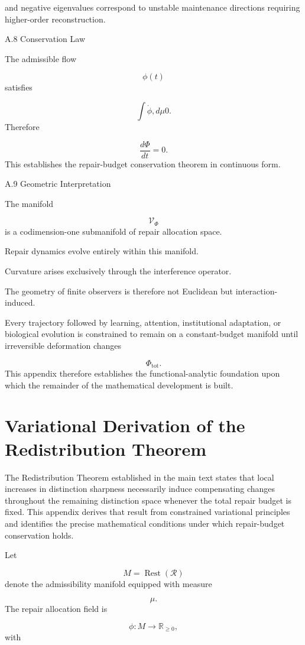 \documentclass[12pt,oneside]{article}
\theoremstyle{plain}
\theoremstyle{definition}
\theoremstyle{remark}
\DeclareMathOperator{\Rest}{Rest}
\begin{document}
and negative eigenvalues correspond to unstable maintenance directions requiring higher-order reconstruction.


A.8 Conservation Law

The admissible flow

\[
\phi(t)
\]
satisfies

\[
\int
\dot\phi
,d\mu
0. 
\]
Therefore

\[
\boxed{
\frac{d\Phi}{dt}=0.
}
\]
This establishes the repair-budget conservation theorem in continuous form.


A.9 Geometric Interpretation

The manifold

\[
\mathcal V_\Phi
\]
is a codimension-one submanifold of repair allocation space.

Repair dynamics evolve entirely within this manifold.

Curvature arises exclusively through the interference operator.

The geometry of finite observers is therefore not Euclidean but interaction-induced.

Every trajectory followed by learning, attention, institutional adaptation, or biological evolution is constrained to remain on a constant-budget manifold until irreversible deformation changes

\[
\Phi_{\mathrm{tot}}.
\]
This appendix therefore establishes the functional-analytic foundation upon which the remainder of the mathematical development is built.

\section{Variational Derivation of the Redistribution Theorem}

The Redistribution Theorem established in the main text states that local increases in distinction sharpness necessarily induce compensating changes throughout the remaining distinction space whenever the total repair budget is fixed. This appendix derives that result from constrained variational principles and identifies the precise mathematical conditions under which repair-budget conservation holds.

Let

\[
M=\Rest(\mathcal R)
\]
denote the admissibility manifold equipped with measure

\[
\mu.
\]
The repair allocation field is

\[
\phi:M\rightarrow\mathbb R_{\ge0},
\]
with
\end{document}
